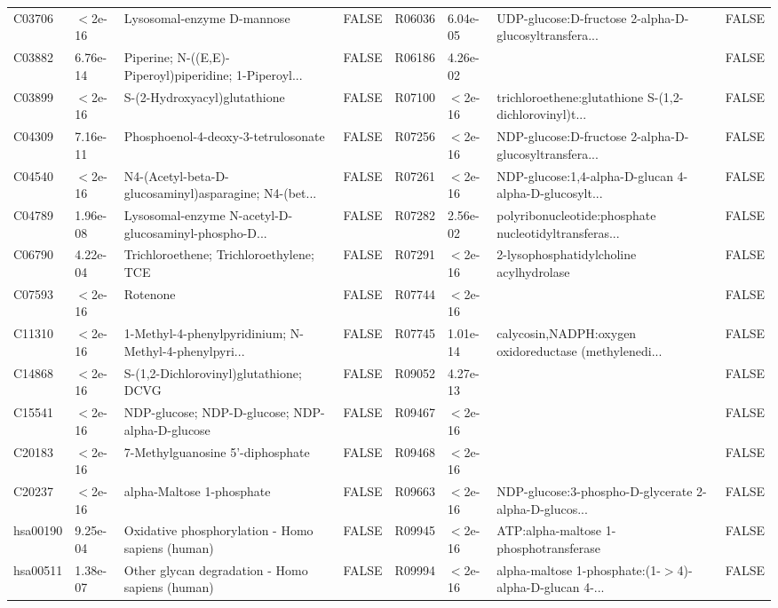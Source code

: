 \documentclass{article}\usepackage[]{graphicx}\usepackage[]{color}
\begin{document}
{{\begin{tabular}{llllllll}
  C03706 & $<$2e-16 & Lysosomal-enzyme D-mannose & FALSE & R06036 &  6.04e-05 & UDP-glucose:D-fructose 2-alpha-D-glucosyltransfera... & FALSE \\ 
  C03882 &  6.76e-14 & Piperine; N-((E,E)-Piperoyl)piperidine; 1-Piperoyl... & FALSE & R06186 &  4.26e-02 &  & FALSE \\ 
  C03899 & $<$2e-16 & S-(2-Hydroxyacyl)glutathione & FALSE & R07100 & $<$2e-16 & trichloroethene:glutathione S-(1,2-dichlorovinyl)t... & FALSE \\ 
  C04309 &  7.16e-11 & Phosphoenol-4-deoxy-3-tetrulosonate & FALSE & R07256 & $<$2e-16 & NDP-glucose:D-fructose 2-alpha-D-glucosyltransfera... & FALSE \\ 
  C04540 & $<$2e-16 & N4-(Acetyl-beta-D-glucosaminyl)asparagine; N4-(bet... & FALSE & R07261 & $<$2e-16 & NDP-glucose:1,4-alpha-D-glucan 4-alpha-D-glucosylt... & FALSE \\ 
  C04789 &  1.96e-08 & Lysosomal-enzyme N-acetyl-D-glucosaminyl-phospho-D... & FALSE & R07282 &  2.56e-02 & polyribonucleotide:phosphate nucleotidyltransferas... & FALSE \\ 
  C06790 &  4.22e-04 & Trichloroethene; Trichloroethylene; TCE & FALSE & R07291 & $<$2e-16 & 2-lysophosphatidylcholine acylhydrolase & FALSE \\ 
  C07593 & $<$2e-16 & Rotenone & FALSE & R07744 & $<$2e-16 &  & FALSE \\ 
  C11310 & $<$2e-16 & 1-Methyl-4-phenylpyridinium; N-Methyl-4-phenylpyri... & FALSE & R07745 &  1.01e-14 & calycosin,NADPH:oxygen oxidoreductase (methylenedi... & FALSE \\ 
  C14868 & $<$2e-16 & S-(1,2-Dichlorovinyl)glutathione; DCVG & FALSE & R09052 &  4.27e-13 &  & FALSE \\ 
  C15541 & $<$2e-16 & NDP-glucose; NDP-D-glucose; NDP-alpha-D-glucose & FALSE & R09467 & $<$2e-16 &  & FALSE \\ 
  C20183 & $<$2e-16 & 7-Methylguanosine 5'-diphosphate & FALSE & R09468 & $<$2e-16 &  & FALSE \\ 
  C20237 & $<$2e-16 & alpha-Maltose 1-phosphate & FALSE & R09663 & $<$2e-16 & NDP-glucose:3-phospho-D-glycerate 2-alpha-D-glucos... & FALSE \\ 
  hsa00190 &  9.25e-04 & Oxidative phosphorylation - Homo sapiens (human) & FALSE & R09945 & $<$2e-16 & ATP:alpha-maltose 1-phosphotransferase & FALSE \\ 
  hsa00511 &  1.38e-07 & Other glycan degradation - Homo sapiens (human) & FALSE & R09994 & $<$2e-16 & alpha-maltose 1-phosphate:(1-$>$4)-alpha-D-glucan 4-... & FALSE \\ 

\end{tabular}}}
\end{document}
